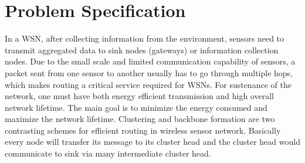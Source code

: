 \section{Problem Specification} \label{sec:problem}

In a \ac{WSN}, after collecting information from the environment, sensors need to transmit aggregated data to sink nodes (gateways) or information collection nodes. Due to the small scale and limited communication capability of sensors, a packet sent from one sensor to another usually has to go through multiple hops, which makes routing a critical service required for \acp{WSN}. For sustenance of the network, one must have both energy efficient transmission and high overall network lifetime. The main goal is to minimize the energy consumed and maximize the network lifetime. Clustering and backbone formation are two contrasting schemes for efficient routing in wireless sensor network\cite{tandon2012determination}. Basically every node will transfer its message to its cluster head and the cluster head would communicate to sink via many intermediate cluster head.

